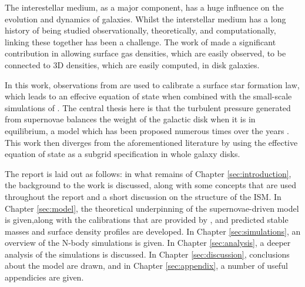 The interestellar medium, as a major component, has a huge influence on the evolution and dynamics of galaxies.
Whilst the interstellar medium has a long history of being studied observationally, theoretically, and computationally, linking these together has been a challenge.
The work of \citet{schaye_star_2004} made a significant contribution in allowing surface gas densities, which are easily observed, to be connected to 3D densities, which are easily computed, in disk galaxies.

In this work, observations from \citet{bigiel_star_2008} are used to calibrate a surface star formation law, which leads to an effecive equation of state when combined with the small-scale simulations of \citet{martizzi_supernova_2015}.
The central thesis here is that the turbulent pressure generated from supernovae balances the weight of the galactic disk when it is in equilibrium, a model which has been proposed numerous times over the years \citep{silk_feedback_1997, ostriker_maximally_2011, faucher-giguere_feedback_2013, martizzi_supernova_2016}.
This work then diverges from the aforementioned literature by using the effective equation of state as a subgrid specification in whole galaxy disks.

The report is laid out as follows: in what remains of Chapter \ref{sec:introduction}, the background to the work is discussed, along with some concepts that are used throughout the report and a short discussion on the structure of the ISM.
In Chapter \ref{sec:model}, the theoretical underpinning of the supernovae-driven model is given,along with the calibrations that are provided by \citet{martizzi_supernova_2015}, and predicted stable masses and surface density profiles are developed.
In Chapter \ref{sec:simulations}, an overview of the N-body simulations is given.
In Chapter \ref{sec:analysis}, a deeper analysis of the simulations is discussed.
In Chapter \ref{sec:discussion}, conclusions about the model are drawn, and in Chapter \ref{sec:appendix}, a number of useful appendicies are given.
